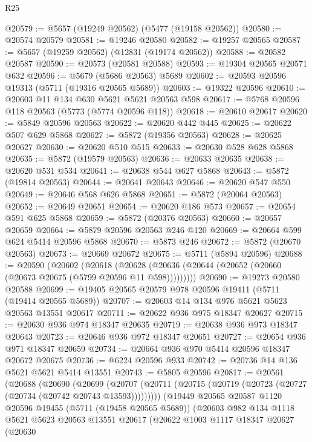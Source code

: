 \begin{lexlean}{R25}
\begin{coremodule}
@20579 := @5657 (@19249 @20562) (@5477 (@19158 @20562))
@20580 := @20574 @20579
@20581 := @19246 @20580
@20582 := @19257 @20565
@20587 := @5657 (@19259 @20562) (@12831 (@19174 @20562))
@20588 := @20582 @20587
@20590 := @20573 (@20581 @20588)
@20593 := @19304 @20565 @20571 @632
@20596 := @5679 (@5686 @20563) @5689
@20602 := @20593 @20596 @19313 (@5711 (@19316 @20565 @5689))
@20603 := @19322 @20596
@20610 := @20603 @11 @134 @630 @5621 @5621 @20563 @598
@20617 := @5768 @20596 @118 @20563 (@5773 (@5774 @20596 @118))
@20618 := @20610 @20617
@20620 := @5849 @20596 @20563
@20622 := @20620 @442 @445
@20625 := @20622 @507 @629 @5868
@20627 := @5872 (@19356 @20563)
@20628 := @20625 @20627
@20630 := @20620 @510 @515
@20633 := @20630 @528 @628 @5868
@20635 := @5872 (@19579 @20563)
@20636 := @20633 @20635
@20638 := @20620 @531 @534
@20641 := @20638 @544 @627 @5868
@20643 := @5872 (@19814 @20563)
@20644 := @20641 @20643
@20646 := @20620 @547 @550
@20649 := @20646 @568 @626 @5868
@20651 := @5872 (@20064 @20563)
@20652 := @20649 @20651
@20654 := @20620 @186 @573
@20657 := @20654 @591 @625 @5868
@20659 := @5872 (@20376 @20563)
@20660 := @20657 @20659
@20664 := @5879 @20596 @20563 @246 @120
@20669 := @20664 @599 @624 @5414 @20596 @5868
@20670 := @5873 @246
@20672 := @5872 (@20670 @20563)
@20673 := @20669 @20672
@20675 := @5711 (@5894 @20596)
@20688 := @20590
    (@20602
      (@20618 (@20628 (@20636 (@20644 (@20652 (@20660 (@20673 @20675 (@5799 @20596 @11 @598)))))))))
@20690 := @19273 @20580 @20588
@20699 := @19405 @20565 @20579 @978 @20596 @19411 (@5711 (@19414 @20565 @5689))
@20707 := @20603 @14 @134 @976 @5621 @5623 @20563 @13551 @20617
@20711 := @20622 @936 @975 @18347 @20627
@20715 := @20630 @936 @974 @18347 @20635
@20719 := @20638 @936 @973 @18347 @20643
@20723 := @20646 @936 @972 @18347 @20651
@20727 := @20654 @936 @971 @18347 @20659
@20734 := @20664 @936 @970 @5414 @20596 @18347 @20672 @20675
@20736 := @6224 @20596 @933
@20742 := @20736 @14 @136 @5621 @5621 @5414 @13551
@20743 := @5805 @20596
@20817 := @20561
    (@20688
      (@20690
        (@20699
          (@20707 (@20711 (@20715 (@20719 (@20723 (@20727 (@20734 (@20742 @20743 @13593)))))))))
        (@19449
          @20565
          @20587
          @1120
          @20596
          @19455
          (@5711 (@19458 @20565 @5689))
          (@20603
            @982
            @134
            @1118
            @5621
            @5623
            @20563
            @13551
            @20617
            (@20622
              @1003
              @1117
              @18347
              @20627
              (@20630

\end{coremodule}
\end{lexlean}
